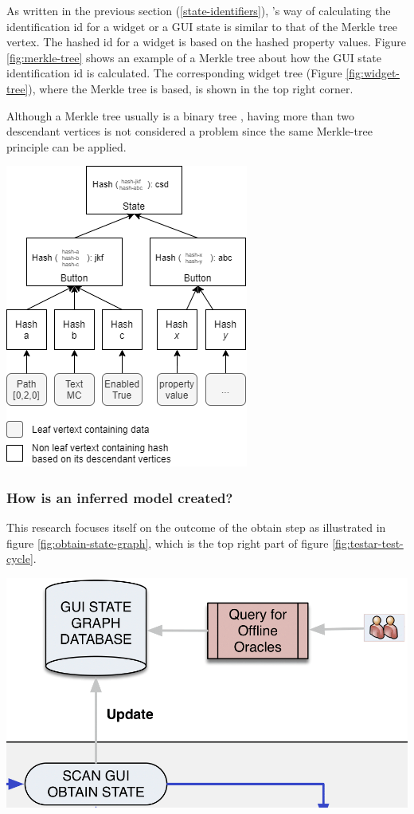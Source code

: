 As written in the previous section (\ref{state-identifiers}), \testar's way of calculating the identification id for a widget or a GUI state is similar to that of the Merkle tree vertex. The hashed id for a widget is based on the hashed property values. Figure \ref{fig:merkle-tree} shows an example of a Merkle tree about how the GUI state identification id is calculated. The corresponding widget tree (Figure \ref{fig:widget-tree}), where the Merkle tree is based, is shown in the top right corner.

Although a Merkle tree usually is a binary tree \cite{merkle-tree}, having more than two descendant vertices is not considered a problem since the same Merkle-tree principle can be applied.

\bigskip
\begingroup
\captionsetup{type=figure}
\includegraphics[scale=0.8]{images/merkle-tree-example.png}
\label{fig:merkle-tree}
\endgroup

\subsubsection{How is an inferred model created?}
This research focuses itself on the outcome of the obtain step as illustrated in figure \ref{fig:obtain-state-graph}, which is the top right part of figure \ref{fig:testar-test-cycle}.

\bigskip
\begingroup
\captionsetup{type=figure}
\includegraphics[scale=0.4]{images/obtain-state-graph.png}
\label{fig:obtain-state-graph}
\endgroup

